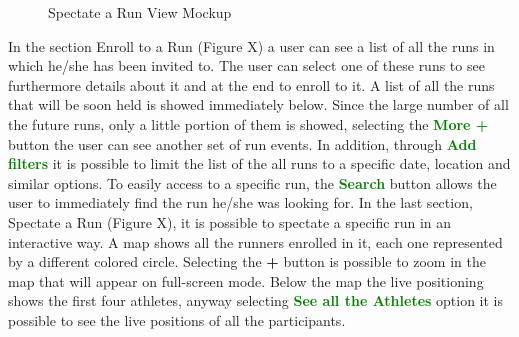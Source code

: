 \begin{enumerate}
\begin{figure}[H]
\begin{center}
\begin{minipage}[c]{.40\textwidth}
	\caption{Spectate a Run View Mockup}
        \end{minipage}
      \end{center}
\end{figure}
In the section Enroll to a Run (Figure X) a user can see a list of all the runs in which he/she has been invited to. The user can select one of these runs to see furthermore details about it and at the end to enroll to it. A list of all the runs that will be soon held is showed immediately below. Since the large number of all the future runs, only a little portion of them is showed, selecting the {\textcolor{Green}{\textbf{More +}}} button the user can see another set of run events. In addition, through {\textcolor{Green}{\textbf{Add filters}}} it is possible to limit the list of the all runs to a specific date, location and similar options. To easily access to a specific run, the {\textcolor{Green}{\textbf{Search}}} button allows the user to immediately find the run he/she was looking for. In the last section, Spectate a Run (Figure X), it is possible to spectate a specific run in an interactive way. A map shows all the runners enrolled in it, each one represented by a different colored circle. Selecting the \textbf{+} button is possible to zoom in the map that will appear on full-screen mode. Below the map the live positioning shows the first four athletes, anyway selecting {\textcolor{Green}{\textbf{See all the Athletes}}} option it is possible to see the live positions of all the participants.
\clearpage
\end{enumerate}